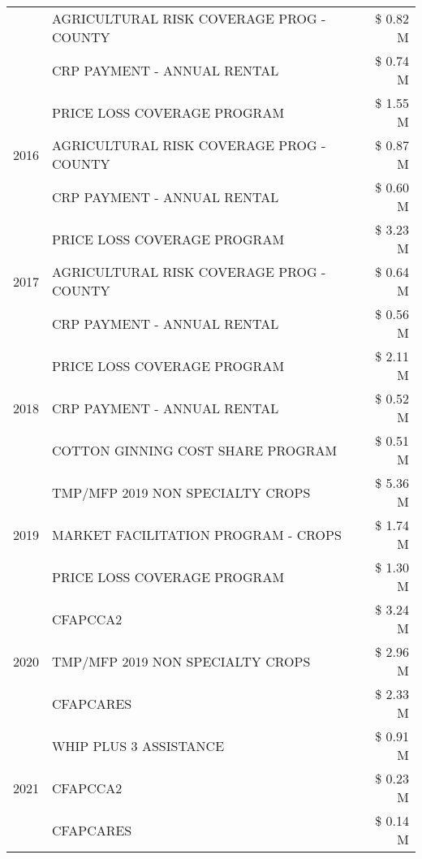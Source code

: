 \begin{tabular}{llr}
 & AGRICULTURAL RISK COVERAGE PROG - COUNTY & \$ 0.82 M \\
 & CRP PAYMENT - ANNUAL RENTAL & \$ 0.74 M \\
\cline{1-3}
\multirow[t]{3}{*}{2016} & PRICE LOSS COVERAGE PROGRAM & \$ 1.55 M \\
 & AGRICULTURAL RISK COVERAGE PROG - COUNTY & \$ 0.87 M \\
 & CRP PAYMENT - ANNUAL RENTAL & \$ 0.60 M \\
\cline{1-3}
\multirow[t]{3}{*}{2017} & PRICE LOSS COVERAGE PROGRAM & \$ 3.23 M \\
 & AGRICULTURAL RISK COVERAGE PROG - COUNTY & \$ 0.64 M \\
 & CRP PAYMENT - ANNUAL RENTAL & \$ 0.56 M \\
\cline{1-3}
\multirow[t]{3}{*}{2018} & PRICE LOSS COVERAGE PROGRAM & \$ 2.11 M \\
 & CRP PAYMENT - ANNUAL RENTAL & \$ 0.52 M \\
 & COTTON GINNING COST SHARE PROGRAM & \$ 0.51 M \\
\cline{1-3}
\multirow[t]{3}{*}{2019} & TMP/MFP 2019 NON SPECIALTY CROPS & \$ 5.36 M \\
 & MARKET FACILITATION PROGRAM - CROPS & \$ 1.74 M \\
 & PRICE LOSS COVERAGE PROGRAM & \$ 1.30 M \\
\cline{1-3}
\multirow[t]{3}{*}{2020} & CFAPCCA2 & \$ 3.24 M \\
 & TMP/MFP 2019 NON SPECIALTY CROPS & \$ 2.96 M \\
 & CFAPCARES & \$ 2.33 M \\
\cline{1-3}
\multirow[t]{3}{*}{2021} & WHIP PLUS 3 ASSISTANCE & \$ 0.91 M \\
 & CFAPCCA2 & \$ 0.23 M \\
 & CFAPCARES & \$ 0.14 M \\
\cline{1-3}
\bottomrule
\end{tabular}
